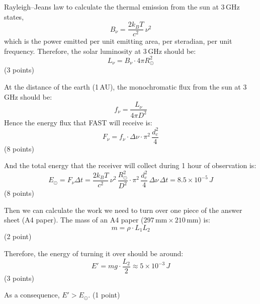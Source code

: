 Rayleigh--Jeans law to calculate the thermal emission from the sun at 3\,GHz
states,
\[ B_\nu = \frac{2k_B T}{c^2}\,\nu^2 \]
which is the power emitted per unit emitting area, per steradian, per unit
frequency. Therefore, the solar luminosity at 3\,GHz should be:
\[ L_\nu = B_\nu \cdot 4\pi R_\odot^2 \]
\hfill(3 points)

At the distance of the earth (1\,AU), the monochromatic flux from the sun at
3\,GHz should be:
\[ f_\nu = \frac{L_\nu}{4\pi D^2} \]
Hence the energy flux that FAST will receive is:
\[ F_\nu = f_\nu \cdot \Delta\nu \cdot \pi^2\,\frac{d_c^2}{4} \]
\hfill(8 points)

And the total energy that the receiver will collect during 1 hour of
observation is:
\[ E_\odot = F_\nu\Delta t
   = \frac{2k_B T}{c^2}\,\nu^2\,\frac{R_\odot^2}{D^2}
     \cdot \pi^2\,\frac{d_c^2}{4}\,\Delta\nu\,\Delta t
   = 8.5\times10^{-5}\,J \]
\hfill(8 points)

Then we can calculate the work we need to turn over one piece of the answer
sheet (A4 paper). The mass of an A4 paper
($297\,\mathrm{mm}\times210\,\mathrm{mm}$) is:
\[ m = \rho \cdot L_1 L_2 \]
\hfill(2 point)

Therefore, the energy of turning it over should be around:
\[ E' = mg \cdot \frac{L_2}{2} \approx 5\times10^{-3}\,J \]
\hfill(3 points)

As a consequence, $E' > E_\odot$. \hfill(1 point)
